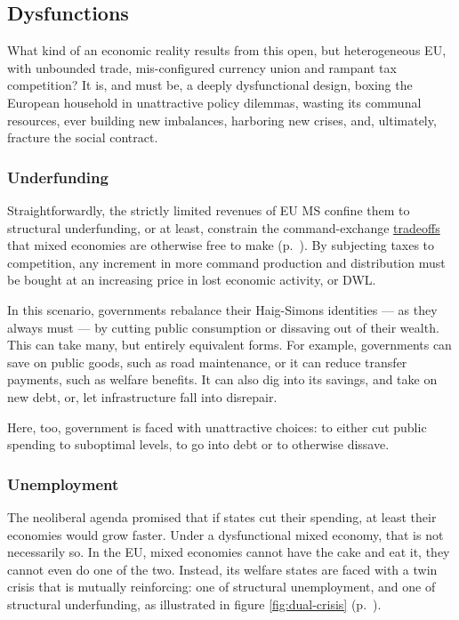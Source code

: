 \documentclass[11pt,a4paper,oneside]{article}
\begin{document}
\subsection{Dysfunctions} \label{sec:defunct}
What kind of an economic reality results from this open, but heterogeneous \gls{EU}, with unbounded trade, mis-configured currency union and rampant tax competition?
It is, and must be, a deeply dysfunctional design, boxing the European household in unattractive policy dilemmas, wasting its communal resources, ever building new imbalances, harboring new crises, and, ultimately, fracture the social contract.

\subsubsection{Underfunding} \label{sec:public-squalor}
Straightforwardly, the strictly limited revenues of \gls{EU} \gls{MS} confine them to structural underfunding, or at least, constrain the command-exchange \hyperref[sec:tradeoffs]{tradeoffs} that mixed economies are otherwise free to make (p.~\pageref{sec:tradeoffs}). %
By subjecting taxes to competition, any increment in more command production and distribution must be bought at an increasing price in lost economic activity, or \gls{DWL}.

In this scenario, governments rebalance their Haig-Simons identities --- as they always must --- by cutting public consumption or dissaving out of their wealth.
This can take many, but entirely equivalent forms.
For example, governments can save on public goods, such as road maintenance, or it can reduce transfer payments, such as welfare benefits.
It can also dig into its savings, and take on new debt, or, let infrastructure fall into disrepair.

Here, too, government is faced with unattractive choices:
to either cut public spending to suboptimal levels, to go into debt or to otherwise dissave.


\subsubsection{Unemployment}
The neoliberal agenda promised that if states cut their spending, at least their economies would grow faster.
Under a dysfunctional mixed economy, that is not necessarily so.
In the \gls{EU}, mixed economies cannot have the cake and eat it, they cannot even do one of the two.
Instead, its welfare states are faced with a twin crisis that is mutually reinforcing:
one of structural unemployment, and one of structural underfunding, as illustrated in figure \ref{fig:dual-crisis} (p.~\pageref{fig:dual-crisis}).
\end{document}

